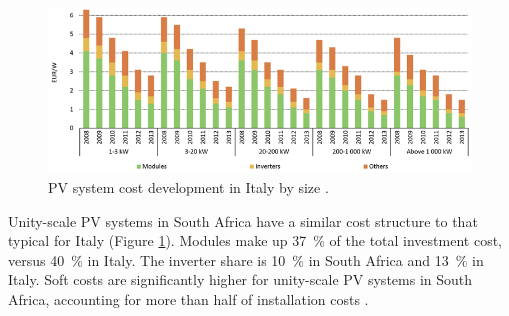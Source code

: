 \begin{figure}[htbp]  
\centering
\includegraphics[width=1\linewidth]{FIG/PVsystemCosts}
\caption[PV system cost development by size.]{PV system cost development in Italy by size \cite{IEA2014c}.}\label{PVsystemCosts}
\end{figure}
Unity-scale PV systems in South Africa have a similar cost structure to that typical for Italy (Figure \ref{PVsystemCosts}). Modules make up \SI{37}{\percent} of the total investment cost, versus \SI{40}{\percent} in Italy. The inverter share is \SI{10}{\percent} in South Africa and \SI{13}{\percent} in Italy. Soft costs are significantly higher for unity-scale PV systems in South Africa, accounting for more than half of installation costs \cite{IEA2014c,Terblanche2015}.

